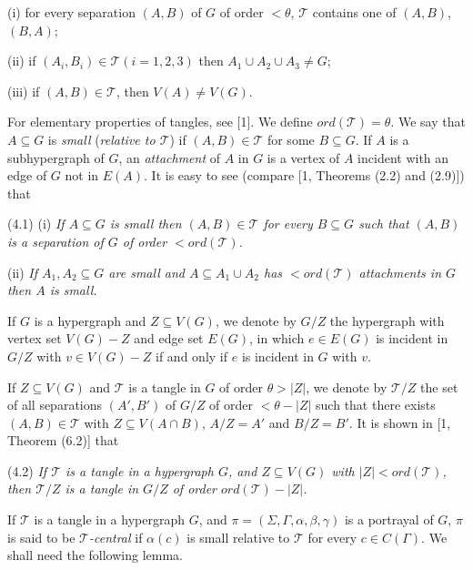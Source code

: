 \hspace*{12pt}(i) for every separation $(A, B)$ of $G$ of order $< \theta$, $\mathscr{T}$ contains one of $(A, B)$, $(B, A)$;

\hspace*{12pt}(ii) if $(A_i, B_i) \in \mathscr{T} (i = 1, 2, 3)$ then $A_1 \cup A_2 \cup A_3 \ne G$;

\hspace*{12pt}(iii) if $(A, B) \in \mathscr{T}$, then $V(A) \ne V(G)$.

For elementary properties of tangles, see [1]. We define $ord(\mathscr{T}) = \theta$. We say that $A \subseteq G$ is \textit{small} (\textit{relative to $\mathscr{T}$}) if $(A, B) \in \mathscr{T}$ for some $B \subseteq G$. If $A$ is a subhypergraph of $G$, an \textit{attachment} of $A$ in $G$ is a vertex of $A$ incident with an edge of $G$ not in $E(A)$. It is easy to see (compare [1, Theorems (2.2) and (2.9)]) that

\stmt
(4.1) (i) \textit{If $A \subseteq G$ is small then $(A, B) \in \mathscr{T}$ for every $B \subseteq G$ such that $(A, B)$ is a separation of $G$ of order $< ord(\mathscr{T})$.}

\hspace*{12pt}(ii) \textit{If $A_1, A_2 \subseteq G$ are small and $A \subseteq A_1 \cup A_2$ has $< ord(\mathscr{T})$ attachments in $G$ then $A$ is small.}

If $G$ is a hypergraph and $Z \subseteq V(G)$, we denote by $G/Z$ the hypergraph with vertex set $V(G) - Z$ and edge set $E(G)$, in which $e \in E(G)$ is incident in $G/Z$ with $v \in V(G) - Z$ if and only if $e$ is incident in $G$ with $v$.

If $Z \subseteq V(G)$ and $\mathscr{T}$ is a tangle in $G$ of order $\theta > |Z|$, we denote by $\mathscr{T}/Z$ the set of all separations $(A', B')$ of $G/Z$ of order $< \theta - |Z|$ such that there exists $(A, B) \in \mathscr{T}$ with $Z \subseteq V(A \cap B)$, $A/Z = A'$ and $B/Z = B'$. It is shown in [1, Theorem (6.2)] that

\stmt
(4.2) \textit{If $\mathscr{T}$ is a tangle in a hypergraph $G$, and $Z \subseteq V(G)$ with $|Z| < ord(\mathscr{T})$, then $\mathscr{T}/Z$ is a tangle in $G/Z$ of order $ord(\mathscr{T}) - |Z|$.}

If $\mathscr{T}$ is a tangle in a hypergraph $G$, and $\pi = (\Sigma, \Gamma, \alpha, \beta, \gamma)$ is a portrayal of $G$, $\pi$ is said to be \textit{$\mathscr{T}$-central} if $\alpha(c)$ is small relative to $\mathscr{T}$ for every $c \in C(\Gamma)$. We shall need the following lemma.

